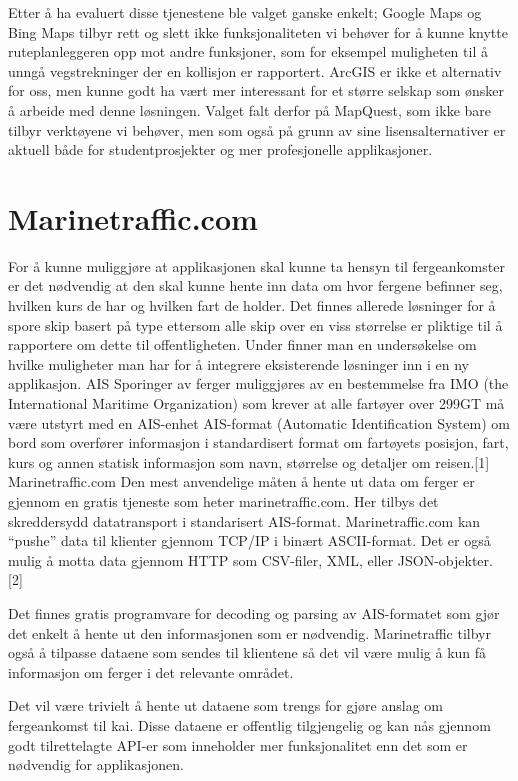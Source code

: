 \documentclass[a4paper,norsk,oneside]{book}
\begin{document}
Etter å ha evaluert disse tjenestene ble valget ganske enkelt; Google Maps og Bing Maps tilbyr rett og slett ikke funksjonaliteten vi behøver for å kunne knytte ruteplanleggeren opp mot andre funksjoner, som for eksempel muligheten til å unngå vegstrekninger der en kollisjon er rapportert. ArcGIS er ikke et alternativ for oss, men kunne godt ha vært mer interessant for et større selskap som ønsker å arbeide med denne løsningen. Valget falt derfor på MapQuest, som ikke bare tilbyr verktøyene vi behøver, men som også på grunn av sine lisensalternativer er aktuell både for studentprosjekter og mer profesjonelle applikasjoner.

\section{Marinetraffic.com}
For å kunne muliggjøre at applikasjonen skal kunne ta hensyn til fergeankomster er det nødvendig at den skal kunne hente inn data om hvor fergene befinner seg, hvilken kurs de har og hvilken fart de holder. Det finnes allerede løsninger for å spore skip basert på type ettersom alle skip over en viss størrelse er pliktige til å rapportere om dette til offentligheten. Under finner man en undersøkelse om hvilke muligheter man har for å integrere eksisterende løsninger inn i en ny applikasjon.
AIS
Sporinger av ferger muliggjøres av en bestemmelse fra IMO (the International Maritime Organization) som krever at alle fartøyer over 299GT må være utstyrt med en AIS-enhet AIS-format (Automatic Identification System) om bord som overfører informasjon i standardisert format om fartøyets posisjon, fart, kurs og annen statisk informasjon som navn, størrelse og detaljer om reisen.[1]
Marinetraffic.com
Den mest anvendelige måten å hente ut data om ferger er gjennom en gratis tjeneste som heter marinetraffic.com. Her tilbys det skreddersydd datatransport i standarisert AIS-format. Marinetraffic.com kan “pushe” data til klienter gjennom TCP/IP i binært ASCII-format. Det er også mulig å motta data gjennom HTTP som CSV-filer, XML, eller JSON-objekter. [2]

Det finnes gratis programvare for decoding og parsing av AIS-formatet som gjør det enkelt å hente ut den informasjonen som er nødvendig. Marinetraffic tilbyr også å tilpasse dataene som sendes til klientene så det vil være mulig å kun få informasjon om ferger i det relevante området.

Det vil være trivielt å hente ut dataene som trengs for gjøre anslag om fergeankomst til kai. Disse dataene er offentlig tilgjengelig og kan nås gjennom godt tilrettelagte API-er som inneholder mer funksjonalitet enn det som er nødvendig for applikasjonen.
\end{document}
